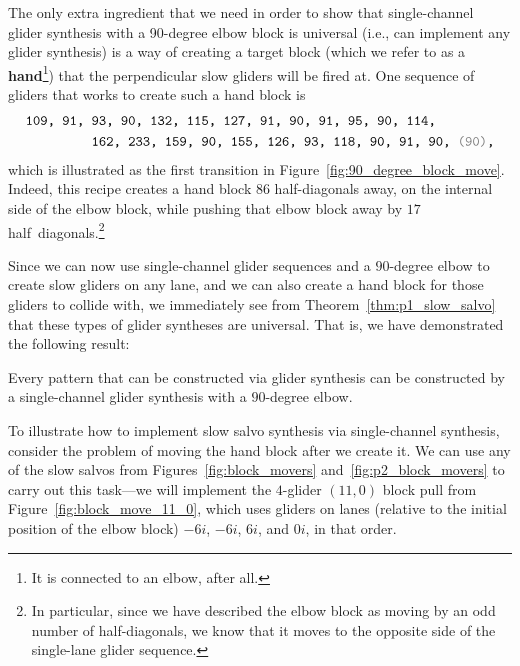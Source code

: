 The only extra ingredient that we need in order to show that single-channel glider synthesis with a 90-degree elbow block is universal (i.e., can implement any glider synthesis) is a way of creating a target block (which we refer to as a \textbf{hand}\footnote{It is connected to an elbow, after all.}) that the perpendicular slow gliders will be fired at. One sequence of gliders that works to create such a hand block is
\begin{align}\begin{split}\label{eq:make_hand_90_deg}
& \text{\texttt{109, 91, 93, 90, 132, 115, 127, 91, 90, 91, 95, 90, 114,}} \\
& \text{\texttt{~~~~~~~~~162, 233, 159, 90, 155, 126, 93, 118, 90, 91, 90, {\color{gray}(90)},}}
\end{split}\end{align}
which is illustrated as the first transition in Figure~\ref{fig:90_degree_block_move}. Indeed, this recipe creates a hand block $86$ half-diagonals away, on the internal side of the elbow block, while pushing that elbow block away by $17$ half~diagonals.\footnote{In particular, since we have described the elbow block as moving by an odd number of half-diagonals, we know that it moves to the opposite side of the single-lane glider sequence.}

Since we can now use single-channel glider sequences and a $90$-degree elbow to create slow gliders on any lane, and we can also create a hand block for those gliders to collide with, we immediately see from Theorem~\ref{thm:p1_slow_salvo} that these types of glider syntheses are universal. That is, we have demonstrated the following result:

\begin{theorem}\label{thm:single_channel_90_degree}
	Every pattern that can be constructed via glider synthesis can be constructed by a single-channel glider synthesis with a $90$-degree elbow.
\end{theorem}

To illustrate how to implement slow salvo synthesis via single-channel synthesis, consider the problem of moving the hand block after we create it. We can use any of the slow salvos from Figures~\ref{fig:block_movers} and~\ref{fig:p2_block_movers} to carry out this task---we will implement the $4$-glider $(11,0)$ block pull from Figure~\ref{fig:block_move_11_0}, which uses gliders on lanes (relative to the initial position of the elbow block) $-6i$, $-6i$, $6i$, and $0i$, in that order.

